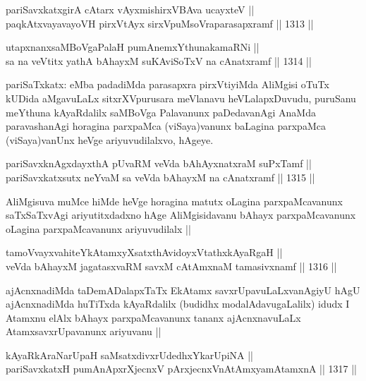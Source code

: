 
\begin{shl}
pariSavxkatxgirA cAtarx vAyxmishirxVBAva ucayxteV || \\
paqkAtxvayavayoVH pirxVtAyx sirxVpuMsoVraparasapxramf ||  1313 ||  
\end{shl}
				
\begin{shl}
utapxnanxsaMBoVgaPalaH pumAnemxYthunakamaRNi || \\
sa na veVtitx yathA bAhayxM suKAviSoTxV na cA\s \s natxramf ||  1314 ||  
\end{shl}

\begin{artha}
pariSaTxkatx: eMba padadiMda parasapxra pirxVtiyiMda AliMgisi oTuTx kUDida aMgavuLaLx sitxrXVpurusara meVlanavu heVLalapxDuvudu, puruSanu meYthuna kAyaRdalilx saMBoVga Palavanunx paDedavanAgi AnaMda paravashanAgi horagina parxpaMca (viSaya)vanunx baLagina parxpaMca (viSaya)vanUnx heVge ariyuvudilalxvo, hAgeye.
\end{artha}

\begin{shl}
pariSavxknAgxdayxthA pUvaRM veVda bAhAyxnatxraM suPxTamf || \\
pariSavxkatxsutx neYvaM sa veVda bAhayxM na cA\s \s natxramf ||  1315 ||  
\end{shl}

\begin{artha}
AliMgisuva muMce hiMde heVge horagina matutx oLagina parxpaMcavanunx saTxSaTxvAgi ariyutitxdadxno hAge AliMgisidavanu bAhayx parxpaMcavanunx oLagina parxpaMcavanunx ariyuvudilalx ||
\end{artha}

\begin{shl}
tamoVvayxvahiteYkAtamxyXsatxthA\s vidoyxVtathxkAyaRgaH || \\
veVda bAhayxM jagatasxvaRM savxM cA\s \s tAmxnaM tamasivxnamf ||  1316 ||  
\end{shl}

\begin{artha}
ajAcnxnadiMda taDemADalapxTaTx EkAtamx savxrUpavuLaLxvanAgiyU hAgU ajAcnxnadiMda huTiTxda kAyaRdalilx (budidhx modalAdavugaLalilx) idudx I Atamxnu elAlx bAhayx parxpaMcavanunx tananx ajAcnxnavuLaLx AtamxsavxrUpavanunx ariyuvanu ||
\end{artha}

\begin{shl}
kAyaRkAraNarUpaH saMsatxdivxrUdedhxYkarUpiNA || \\
pariSavxkatxH pumAnApxrXjecnxV pArxjecnxVnA\s \s tAmx\s yamAtamxnA ||  1317 ||  
\end{shl}

